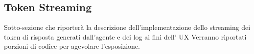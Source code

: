 \subsection{Token Streaming}

Sotto-sezione che riporterà la descrizione dell'implementazione dello streaming dei token di risposta generati dall'agente e dei log ai fini dell' UX
Verranno riportati porzioni di codice per agevolare l'esposizione.